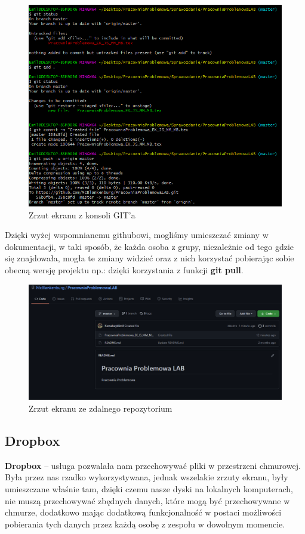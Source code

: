 \documentclass{article}
\begin{document}
		\begin{figure}[!h]
			\centering
			\includegraphics[scale=0.6]{Git.png}
			\caption{Zrzut ekranu z konsoli GIT’a}
		\end{figure}
		
		
		Dzięki wyżej wspomnianemu githubowi, mogliśmy umieszczać zmiany w dokumentacji, w taki sposób, że każda osoba z grupy, niezależnie od tego gdzie się znajdowała, mogła te zmiany widzieć oraz z nich korzystać pobierając sobie obecną wersję projektu np.: dzięki korzystania z funkcji \textbf{git pull}.
		\begin{figure}[!h]
			\centering
			\includegraphics[scale=0.4]{Git2.png}
			\caption{Zrzut ekranu ze zdalnego repozytorium}
		\end{figure}
		
		\subsection{Dropbox}
\textbf{Dropbox} – usługa pozwalała nam przechowywać pliki w przestrzeni chmurowej. Była przez nas rzadko wykorzystywana, jednak wszelakie zrzuty ekranu, były umieszczane właśnie tam, dzięki czemu nasze dyski na lokalnych komputerach, nie muszą przechowywać zbędnych danych, które mogą być przechowywane w chmurze, dodatkowo mając dodatkową funkcjonalność w postaci możliwości pobierania tych danych przez każdą osobę z zespołu w dowolnym momencie.
\end{document}
